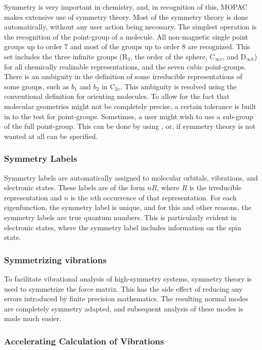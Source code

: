 Symmetry is very important in chemistry, and, in recognition of this, MOPAC
makes extensive use of symmetry theory.  Most of the symmetry theory is done
automatically, without any user action being necessary.  The simplest
operation  is the recognition of the point-group of a molecule.  All
non-magnetic single  point groups up to order 7 and most of the groups up to
order 8 are recognized.   This set includes the three infinite groups (R$_3$,
the order of the sphere,  C$_{\infty v}$, and  D$_{\infty h}$) for all
chemically realizable representations, and the seven  cubic point-groups.
There is an ambiguity in the definition of some irreducible  representations of
some groups, such as $b_1$ and $b_2$ in C$_{2v}$.   This ambiguity is  resolved
using the conventional definition for orienting molecules.  To allow for  the
fact that molecular geometries might not be completely precise, a certain
tolerance is built in to the test for point-groups.  Sometimes, a user might
wish  to use a sub-group of the full point-group.  This can be done by using
, or, if symmetry theory is not wanted at all  can be
specified.

\subsubsection*{Symmetry Labels }

Symmetry labels are automatically assigned to molecular orbitals, vibrations,
and electronic states.  These labels are of the form $nR$, where $R$ is the
irreducible representation and $n$ is the $n$th occurrence of that
representation.  For each eigenfunction, the symmetry label is unique, and for
this and other reasons, the symmetry labels are true quantum numbers.  This is
particularly evident in electronic states, where the symmetry label includes
information on the spin state.

\subsubsection*{Symmetrizing vibrations}

To facilitate vibrational analysis of high-symmetry systems, symmetry theory is
used to symmetrize the force matrix.  This has the side effect of reducing any
errors introduced by finite precision mathematics.  The resulting normal modes
are completely symmetry adapted, and subsequent analysis of these modes is
made much easier.

\subsubsection*{Accelerating Calculation of Vibrations}

